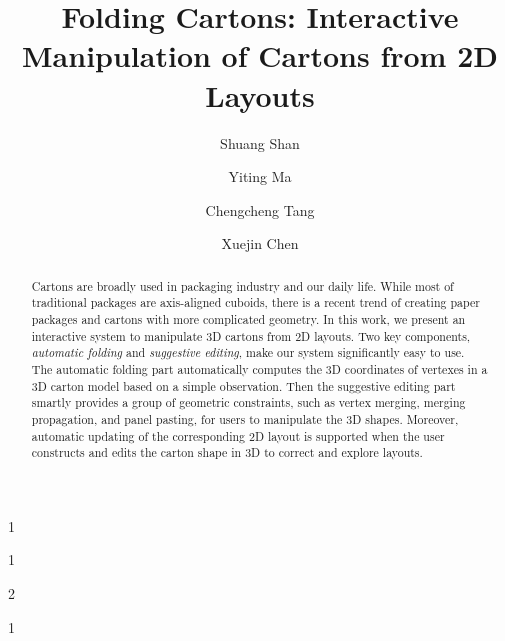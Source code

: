 \documentclass[submission]{gmp2018}
\begin{document}
%
%
\title{Folding Cartons: Interactive Manipulation of Cartons from 2D Layouts}

%
%

%
%
\author{Shuang Shan}{1}
\author{Yiting Ma}{1}
\author{Chengcheng Tang}{2}
\author{Xuejin Chen}{1}

%
%

%
%
 



\newcommand{\comments}[1]{}
\newcommand{\cxj}[1]{\textcolor{red}{(xuejin:#1)}}
\newcommand{\xjmd}[1]{\textcolor{purple}{#1}}
\newcommand{\vo}{\hat{\mathbf{v}}}
\newcommand{\vn}{\mathbf{v}}
\newcommand{\vset}{\mathbb{V}}


\newcommand{\reply}[1]{\textcolor{blue}{#1}}

\maketitle

\begin{abstract}
Cartons are broadly used in packaging industry and our daily life. While most of traditional packages are axis-aligned cuboids, there is a recent trend of creating paper packages and cartons with more complicated geometry. In this work, we present an interactive system to manipulate 3D cartons from 2D layouts. Two key components, \emph{automatic folding} and \emph{suggestive editing}, make our system significantly easy to use. 
The automatic folding part automatically computes the 3D coordinates of vertexes in a 3D carton model based on a simple observation. Then the suggestive editing part smartly provides a group of geometric constraints, such as vertex merging, merging propagation, and panel pasting, for users to manipulate the 3D shapes.
Moreover, automatic updating of the corresponding 2D layout is supported when the user constructs and edits the carton shape in 3D to correct and explore layouts.  
\end{abstract}
\end{document}
